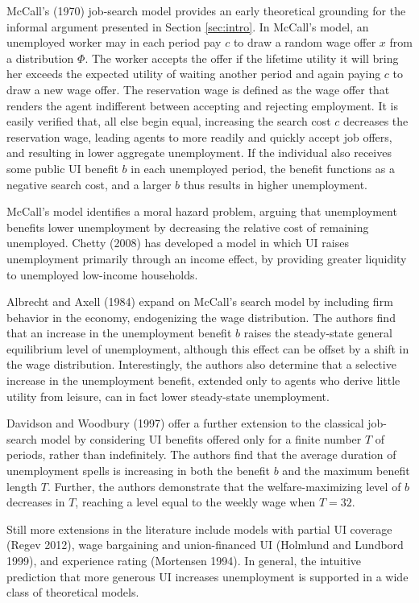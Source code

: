 \documentclass[12pt]{article}
\begin{document}
McCall's (1970) job-search model provides an early theoretical grounding for the informal argument presented in Section \ref{sec:intro}. In McCall's model, an unemployed worker may in each period pay $c$ to draw a random wage offer $x$ from a distribution $\Phi$. The worker accepts the offer if the lifetime utility it will bring her exceeds the expected utility of waiting another period and again paying $c$ to draw a new wage offer. The reservation wage is defined as the wage offer that renders the agent indifferent between accepting and rejecting employment. It is easily verified that, all else begin equal, increasing the search cost $c$ decreases the reservation wage, leading agents to more readily and quickly accept job offers, and resulting in lower aggregate unemployment. If the individual also receives some public UI benefit $b$ in each unemployed period, the benefit functions as a negative search cost, and a larger $b$ thus results in higher unemployment.

McCall's model identifies a moral hazard problem, arguing that unemployment benefits lower unemployment by decreasing the relative cost of remaining unemployed. Chetty (2008) has developed a model in which UI raises unemployment primarily through an income effect, by providing greater liquidity to unemployed low-income households.

Albrecht and Axell (1984) expand on McCall's search model by including firm behavior in the economy, endogenizing the wage distribution. The authors find that an increase in the unemployment benefit $b$ raises the steady-state general equilibrium level of unemployment, although this effect can be offset by a shift in the wage distribution. Interestingly, the authors also determine that a selective increase in the unemployment benefit, extended only to agents who derive little utility from leisure, can in fact lower steady-state unemployment.

Davidson and Woodbury (1997) offer a further extension to the classical job-search model by considering UI benefits offered only for a finite number $T$ of periods, rather than indefinitely. The authors find that the average duration of unemployment spells is increasing in both the benefit $b$ and the maximum benefit length $T$. Further, the authors demonstrate that the welfare-maximizing level of $b$ decreases in $T$, reaching a level equal to the weekly wage when $T=32$.

Still more extensions in the literature include models with partial UI coverage (Regev 2012), wage bargaining and union-financed UI (Holmlund and Lundbord 1999), and experience rating (Mortensen 1994). In general, the intuitive prediction that more generous UI increases unemployment is supported in a wide class of theoretical models.
\end{document}
